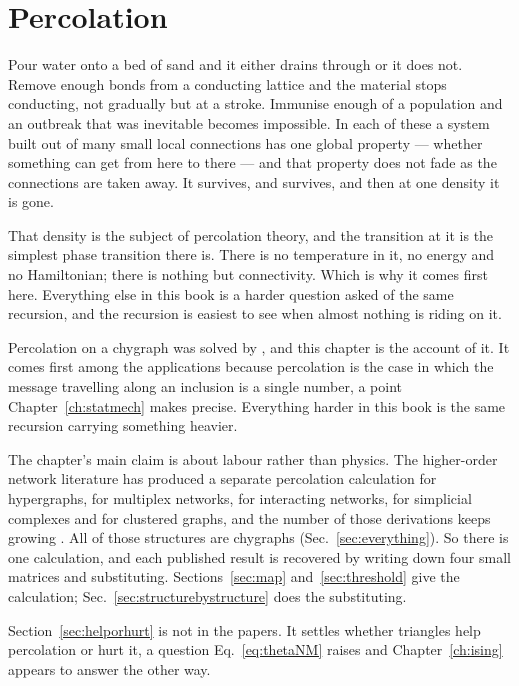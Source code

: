 \chapter{Percolation}
\label{ch:percolation}

Pour water onto a bed of sand and it either drains through or it does not.
Remove enough bonds from a conducting lattice and the material stops conducting,
not gradually but at a stroke. Immunise enough of a population and an outbreak
that was inevitable becomes impossible. In each of these a system built out of
many small local connections has one global property --- whether something can
get from here to there --- and that property does not fade as the connections
are taken away. It survives, and survives, and then at one density it is gone.

That density is the subject of percolation theory, and the transition at it is
the simplest phase transition there is. There is no temperature in it, no
energy and no Hamiltonian; there is nothing but connectivity. Which is why it
comes first here. Everything else in this book is a harder question asked of the
same recursion, and the recursion is easiest to see when almost nothing is
riding on it.

Percolation on a chygraph was solved by
\citet{vazquez2023pre,vazquez2024comnet}, and this chapter is the account
of it. It comes first among the applications because percolation is the case in
which the message travelling along an inclusion is a single number, a point
Chapter~\ref{ch:statmech} makes precise. Everything harder in this book is the
same recursion carrying something heavier.

The chapter's main claim is about labour rather than physics. The higher-order network literature has produced a separate percolation
calculation for hypergraphs, for multiplex networks, for interacting networks,
for simplicial complexes and for clustered graphs, and the number of those
derivations keeps growing
\citep{battiston2020,bianconi2021}. All of those structures are chygraphs
(Sec.~\ref{sec:everything}). So there is one calculation, and each published
result is recovered by writing down four small matrices and substituting.
Sections~\ref{sec:map} and~\ref{sec:threshold} give the calculation;
Sec.~\ref{sec:structurebystructure} does the substituting.

Section~\ref{sec:helporhurt} is not in the papers. It settles whether triangles
help percolation or hurt it, a question Eq.~\eqref{eq:thetaNM} raises and
Chapter~\ref{ch:ising} appears to answer the other way.

